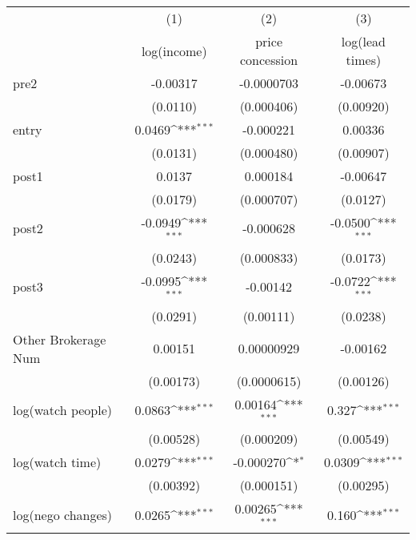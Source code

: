 {
\def\sym#1{\ifmmode^{#1}\else\(^{#1}\)\fi}
\begin{tabular}{l*{3}{c}}
\toprule
            &\multicolumn{1}{c}{(1)}&\multicolumn{1}{c}{(2)}&\multicolumn{1}{c}{(3)}\\
            &\multicolumn{1}{c}{log(income)}&\multicolumn{1}{c}{price concession}&\multicolumn{1}{c}{log(lead times)}\\
\midrule
pre2        &    -0.00317         &  -0.0000703         &    -0.00673         \\
            &    (0.0110)         &  (0.000406)         &   (0.00920)         \\
\addlinespace
entry       &      0.0469\sym{***}&   -0.000221         &     0.00336         \\
            &    (0.0131)         &  (0.000480)         &   (0.00907)         \\
\addlinespace
post1       &      0.0137         &    0.000184         &    -0.00647         \\
            &    (0.0179)         &  (0.000707)         &    (0.0127)         \\
\addlinespace
post2       &     -0.0949\sym{***}&   -0.000628         &     -0.0500\sym{***}\\
            &    (0.0243)         &  (0.000833)         &    (0.0173)         \\
\addlinespace
post3       &     -0.0995\sym{***}&    -0.00142         &     -0.0722\sym{***}\\
            &    (0.0291)         &   (0.00111)         &    (0.0238)         \\
\addlinespace
Other Brokerage Num  &     0.00151         &  0.00000929         &    -0.00162         \\
            &   (0.00173)         & (0.0000615)         &   (0.00126)         \\
\addlinespace
log(watch people)&      0.0863\sym{***}&     0.00164\sym{***}&       0.327\sym{***}\\
            &   (0.00528)         &  (0.000209)         &   (0.00549)         \\
\addlinespace
log(watch time)&      0.0279\sym{***}&   -0.000270\sym{*}  &      0.0309\sym{***}\\
            &   (0.00392)         &  (0.000151)         &   (0.00295)         \\
\addlinespace
log(nego changes)&      0.0265\sym{***}&     0.00265\sym{***}&       0.160\sym{***}\\

\end{tabular}}
